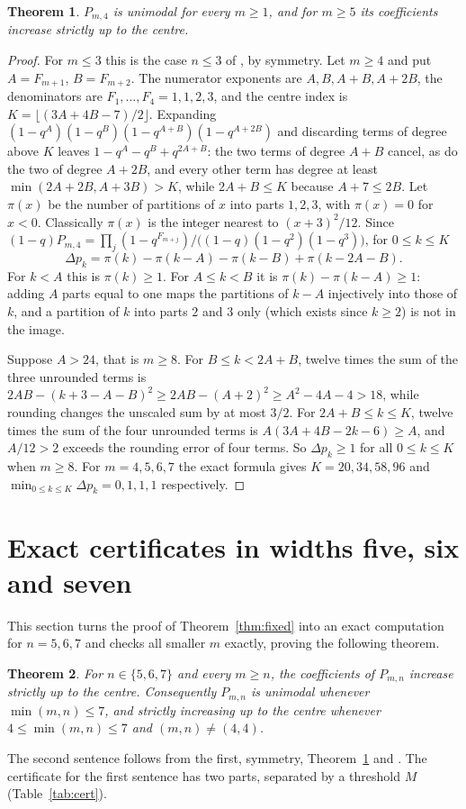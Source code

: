 \documentclass[11pt,a4paper]{article}
\newtheorem{theorem}{Theorem}[section]
\theoremstyle{definition}\newtheorem{definition}[theorem]{Definition}
\theoremstyle{remark}\newtheorem{remark}[theorem]{Remark}\newtheorem{example}[theorem]{Example}
\numberwithin{equation}{section}
\begin{document}
\begin{theorem}\label{thm:width4}
$P_{m,4}$ is unimodal for every $m\ge1$, and for $m\ge5$ its coefficients increase strictly up to the centre.
\end{theorem}
\begin{proof}
For $m\le3$ this is the case $n\le3$ of \cite[Thm.~1.2]{connelly}, by symmetry. Let $m\ge4$ and put $A=F_{m+1}$, $B=F_{m+2}$. The numerator exponents are $A,B,A+B,A+2B$, the denominators are $F_1,\ldots,F_4=1,1,2,3$, and the centre index is $K=\lfloor(3A+4B-7)/2\rfloor$. Expanding $(1-q^A)(1-q^B)(1-q^{A+B})(1-q^{A+2B})$ and discarding terms of degree above $K$ leaves $1-q^A-q^B+q^{2A+B}$: the two terms of degree $A+B$ cancel, as do the two of degree $A+2B$, and every other term has degree at least $\min(2A+2B,A+3B)>K$, while $2A+B\le K$ because $A+7\le2B$. Let $\pi(x)$ be the number of partitions of $x$ into parts $1,2,3$, with $\pi(x)=0$ for $x<0$. Classically $\pi(x)$ is the integer nearest to $(x+3)^2/12$. Since $(1-q)P_{m,4}=\prod_j(1-q^{F_{m+j}})/\big((1-q)(1-q^2)(1-q^3)\big)$, for $0\le k\le K$
\[
 \Delta p_k=\pi(k)-\pi(k-A)-\pi(k-B)+\pi(k-2A-B).
\]
For $k<A$ this is $\pi(k)\ge1$. For $A\le k<B$ it is $\pi(k)-\pi(k-A)\ge1$: adding $A$ parts equal to one maps the partitions of $k-A$ injectively into those of $k$, and a partition of $k$ into parts $2$ and $3$ only (which exists since $k\ge2$) is not in the image.

Suppose $A>24$, that is $m\ge8$. For $B\le k<2A+B$, twelve times the sum of the three unrounded terms is $2AB-(k+3-A-B)^2\ge2AB-(A+2)^2\ge A^2-4A-4>18$, while rounding changes the unscaled sum by at most $3/2$. For $2A+B\le k\le K$, twelve times the sum of the four unrounded terms is $A(3A+4B-2k-6)\ge A$, and $A/12>2$ exceeds the rounding error of four terms. So $\Delta p_k\ge1$ for all $0\le k\le K$ when $m\ge8$. For $m=4,5,6,7$ the exact formula gives $K=20,34,58,96$ and $\min_{0\le k\le K}\Delta p_k=0,1,1,1$ respectively.
\end{proof}

\section{Exact certificates in widths five, six and seven}\label{sec:cert}
This section turns the proof of Theorem~\ref{thm:fixed} into an exact computation for $n=5,6,7$ and checks all smaller $m$ exactly, proving the following theorem.

\begin{theorem}\label{thm:width57}
For $n\in\{5,6,7\}$ and every $m\ge n$, the coefficients of $P_{m,n}$ increase strictly up to the centre. Consequently $P_{m,n}$ is unimodal whenever $\min(m,n)\le7$, and strictly increasing up to the centre whenever $4\le\min(m,n)\le7$ and $(m,n)\ne(4,4)$.
\end{theorem}
The second sentence follows from the first, symmetry, Theorem~\ref{thm:width4} and \cite[Thm.~1.2]{connelly}. The certificate for the first sentence has two parts, separated by a threshold $M$ (Table~\ref{tab:cert}).
\end{document}
